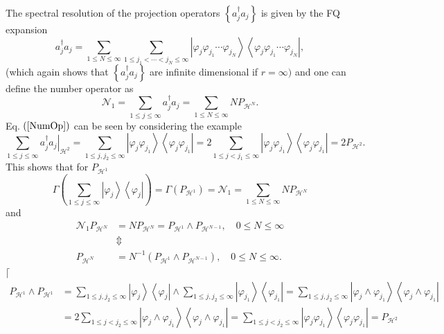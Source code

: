 \documentclass[aps,preprint]{revtex4}%
\begin{document}
The spectral resolution of the projection operators $\left\{  a_{j}^{\dagger
}a_{j}\right\}  $ is given by the FQ expansion
\begin{equation}
a_{j}^{\dagger}a_{j}=\sum_{1\leq N\leq\infty}\sum_{1\leq j_{1}<\cdots
<j_{N}\leq\infty}\left\vert \varphi_{j}\varphi_{j_{1}}\cdots\varphi_{j_{N}%
}\right\rangle \left\langle \varphi_{j}\varphi_{j_{1}}\cdots\varphi_{j_{N}%
}\right\vert , \label{OccNumOp}%
\end{equation}
(which again shows that $\left\{  a_{j}^{\dagger}a_{j}\right\}  $ are infinite
dimensional if $r=\infty)$ and one can define the number operator as
\begin{equation}
\mathcal{N}_{1}=\sum_{1\leq j\leq\infty}a_{j}^{\dagger}a_{j}=\sum_{1\leq
N\leq\infty}NP_{\mathcal{H}^{N}}. \label{NumOp}%
\end{equation}
Eq. $\left(  \ref{NumOp}\right)  $ can be seen by considering the example%
\begin{equation}
\sum_{1\leq j\leq\infty}\left.  a_{j}^{\dagger}a_{j}\right\vert _{\mathcal{H}%
^{2}}=\sum_{1\leq j,j_{2}\leq\infty}\left\vert \varphi_{j}\varphi_{j_{1}%
}\right\rangle \left\langle \varphi_{j}\varphi_{j_{1}}\right\vert
=2\sum_{1\leq j<j_{1}\leq\infty}\left\vert \varphi_{j}\varphi_{j_{1}%
}\right\rangle \left\langle \varphi_{j}\varphi_{j_{1}}\right\vert
=2P_{\mathcal{H}^{2}}.
\end{equation}
This shows that for $P_{\mathcal{H}^{1}}$
\begin{equation}
\Gamma\left(  \sum_{1\leq j\leq\infty}\left\vert \varphi_{j}\right\rangle
\left\langle \varphi_{j}\right\vert \right)  =\Gamma\left(  P_{\mathcal{H}%
^{1}}\right)  =\mathcal{N}_{1}=\sum_{1\leq N\leq\infty}NP_{\mathcal{H}^{N}}%
\end{equation}
and
\begin{align}
\mathcal{N}_{1}P_{\mathcal{H}^{N}}  &  =NP_{\mathcal{H}^{N}}=P_{\mathcal{H}%
^{1}}\wedge P_{\mathcal{H}^{N-1}},\quad0\leq N\leq\infty\nonumber\\
&  \Updownarrow\nonumber\\
P_{\mathcal{H}^{N}}  &  =N^{-1}\left(  P_{\mathcal{H}^{1}}\wedge
P_{\mathcal{H}^{N-1}}\right)  ,\quad0\leq N\leq\infty.
\end{align}
$\lceil$%
\begin{align}
P_{\mathcal{H}^{1}}\wedge P_{\mathcal{H}^{1}}  &  =\sum_{1\leq j,j_{2}%
\leq\infty}\left\vert \varphi_{j}\right\rangle \left\langle \varphi
_{j}\right\vert \wedge\sum_{1\leq j,j_{2}\leq\infty}\left\vert \varphi_{j_{1}%
}\right\rangle \left\langle \varphi_{j_{1}}\right\vert =\sum_{1\leq
j,j_{2}\leq\infty}\left\vert \varphi_{j}\wedge\varphi_{j_{1}}\right\rangle
\left\langle \varphi_{j}\wedge\varphi_{j_{1}}\right\vert \nonumber\\
&  =2\sum_{1\leq j<j_{2}\leq\infty}\left\vert \varphi_{j}\wedge\varphi_{j_{1}%
}\right\rangle \left\langle \varphi_{j}\wedge\varphi_{j_{1}}\right\vert
=\sum_{1\leq j<j_{2}\leq\infty}\left\vert \varphi_{j}\varphi_{j_{1}%
}\right\rangle \left\langle \varphi_{j}\varphi_{j_{1}}\right\vert
=P_{\mathcal{H}^{2}}%
\end{align}
\end{document}
